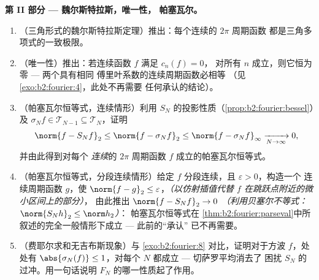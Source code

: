 \begin{problem}
\medskip
\noindent\textbf{第 II 部分 --- 魏尔斯特拉斯，唯一性，
帕塞瓦尔。}
\begin{enumerate}[resume]
  \item （三角形式的魏尔斯特拉斯定理）推出：每个连续的
        $2\pi$ 周期函数
        都是三角多项式的一致极限。
  \item （唯一性）推出：若连续函数 $f$ 满足 $c_n(f) = 0$，
        对所有 $n$ 成立，则它恒为零 --- 两个具有相同
        傅里叶系数的连续周期函数必相等
        （见\cref{exo:b2:fourier:4}，此处不再需要
        任何承认的结论）。
  \item （帕塞瓦尔恒等式，连续情形）利用
        $S_N$ 的投影性质（\cref{prop:b2:fourier:bessel}）及
        $\sigma_Nf \in \mathcal T_{N-1} \subseteq \mathcal
        T_N$，证明
        \[
        \norm{f - S_Nf}_2 \leq \norm{f - \sigma_Nf}_2
        \leq \norm{f - \sigma_Nf}_\infty
        \xrightarrow[N\to\infty]{} 0 ,
        \]
        并由此得到对每个
        \emph{连续}的 $2\pi$ 周期函数 $f$ 成立的帕塞瓦尔恒等式。
  \item （帕塞瓦尔恒等式，分段连续情形）给定 $f$
        分段连续，且 $\varepsilon > 0$，构造一个
        连续周期函数 $g$，使 $\norm{f - g}_2 \leq
        \varepsilon$，\emph{（以仿射插值代替 $f$
        在跳跃点附近的微小区间上的部分）}，
        由此推出 $\norm{f - S_Nf}_2 \to 0$
        \emph{（利用贝塞尔不等式：$\norm{S_Nh}_2 \leq \norm h_2$）}：
        帕塞瓦尔恒等式在
        \cref{thm:b2:fourier:parseval}中所叙述的完全一般情形下成立 --- 此前的“承认”
        已不再需要。
  \item （费耶尔求和无吉布斯现象）与
        \cref{exo:b2:fourier:8} 对比，证明对于方波
        $f$，处处有 $\abs{\sigma_N(f)} \leq 1$，对每个
        $N$ 都成立 --- 切萨罗平均消去了
        困扰 $S_N$ 的过冲。用一句话说明
        $F_N$ 的哪一性质起了作用。
\end{enumerate}


\end{problem}
